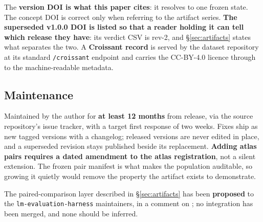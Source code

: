 \medskip
\noindent The \textbf{version DOI is what this paper cites}: it resolves to one
frozen state. The concept DOI is correct only when referring to the artifact
series. \textbf{The superseded v1.0.0 DOI is listed so that a reader holding it
can tell which release they have}: its verdict CSV is rev-2, and
\S\ref{sec:artifacts} states what separates the two. A
\textbf{Croissant record} is served by the dataset repository at its standard
\texttt{/croissant} endpoint and carries the CC-BY-4.0 licence through to the
machine-readable metadata.

\subsection{Maintenance}
\label{app:artifacts:maintenance}

Maintained by the author for \textbf{at least 12 months} from release, via the
source repository's issue tracker, with a target first response of two weeks.
Fixes ship as new tagged versions with a changelog; released versions are never
edited in place, and a superseded revision stays published beside its
replacement. \textbf{Adding atlas pairs requires a dated amendment to the atlas
registration}, not a silent extension. The frozen pair manifest is what makes
the population auditable, so growing it quietly would remove the property the
artifact exists to demonstrate.

The paired-comparison layer described in \S\ref{sec:artifacts} has been
\textbf{proposed} to the \texttt{lm-evaluation-harness} maintainers, in a comment
on \harnessissue; no integration has been merged, and none should be inferred.
